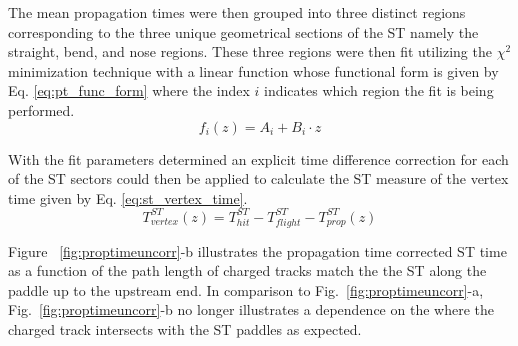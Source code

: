 The mean propagation times were then grouped into three distinct regions corresponding to the three unique geometrical sections of the ST namely the straight, bend, and nose regions.  These three regions were then fit utilizing the $\chi^{2}$ minimization technique with a linear function whose functional form is given by Eq. \ref{eq:pt_func_form} where the index $i$ indicates which region the fit is being performed.
	\begin{equation} \label{eq:pt_func_form}
		f_{i}(z) = A_{i} + B_{i} \cdot z
	\end{equation}
	
With the fit parameters determined an explicit time difference correction for each of the ST sectors could then be applied to calculate the ST measure of the vertex time given by Eq. \ref{eq:st_vertex_time}.
	\begin{equation}\label{eq:st_vertex_time}
	 	T^{ST}_{vertex}(z) = T^{ST}_{hit} - T^{ST}_{flight} - T^{ST}_{prop}(z)
	\end{equation} 
	
Figure ~\ref{fig:proptimeuncorr}-b illustrates the propagation time corrected ST time as a function of the path length of charged tracks match the the ST along the paddle up to the upstream end.
In comparison to Fig.~\ref{fig:proptimeuncorr}-a, Fig.~\ref{fig:proptimeuncorr}-b no longer illustrates a dependence on the where the charged track intersects with the ST paddles as expected.
	
